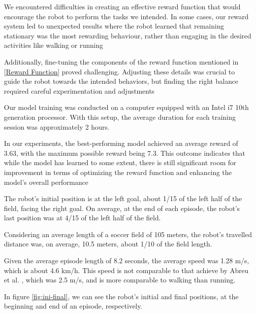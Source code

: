 \documentclass[conference]{IEEEtran}
\begin{document}
We encountered difficulties in creating an effective reward function that would encourage the robot to perform the tasks we intended. In some cases, our reward system led to unexpected results where the robot learned that remaining stationary was the most rewarding behaviour, rather than engaging in the desired activities like walking or running

Additionally, fine-tuning the components of the reward function mentioned in \ref{Reward Function} proved challenging. Adjusting these details was crucial to guide the robot towards the intended behaviors, but finding the right balance required careful experimentation and adjustments

Our model training was conducted on a computer equipped with an Intel i7 10th generation processor. With this setup, the average duration for each training session was approximately 2 hours.

In our experiments, the best-performing model achieved an average reward of 3.63, with the maximum possible reward being 7.3. This outcome indicates that while the model has learned to some extent, there is still significant room for improvement in terms of optimizing the reward function and enhancing the model's overall performance

The robot's initial position is at the left goal, about 1/15 of the left half of the field, facing the right goal. On average, at the end of each episode, the robot's last position was at 4/15 of the left half of the field.

Considering an average length of a soccer field of 105 meters, the robot's travelled distance was, on average, 10.5 meters, about 1/10 of the field length.

Given the average episode length of 8.2 seconds, the average speed was 1.28 m/s, which is about 4.6 km/h. This speed is not comparable to that achieve by Abreu et al. \cite{10.1007/978-3-030-35699-6_1}, which was 2.5 m/s, and is more
comparable to walking than running.

In figure \ref{fig:ini-final}, we can see the robot's initial and final positions, at the beginning and end of an episode, respectively.
\end{document}

